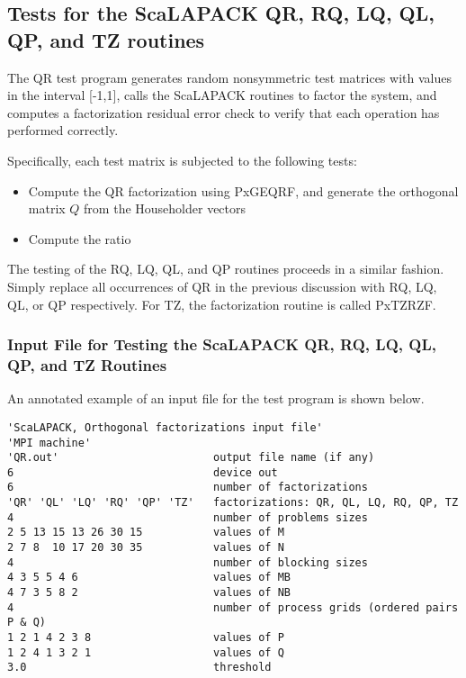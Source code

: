 \documentclass[11pt]{report}
\newcommand{\dent}{\hspace*{\parindent}}
\begin{document}
\subsection{Tests for the ScaLAPACK QR, RQ, LQ, QL, QP, and TZ routines}

The QR test program generates random nonsymmetric test matrices with
values in the interval [-1,1], calls the ScaLAPACK 
routines to factor the system, and computes a
factorization residual error check to verify that each operation has performed 
correctly.

Specifically, each test matrix is subjected to the following tests:

\begin{itemize}
\item
Compute the QR factorization using PxGEQRF, and generate the orthogonal
matrix $Q$ from the Householder vectors
\item
Compute the ratio
\end{itemize}

The testing of the RQ, LQ, QL, and QP routines proceeds in a similar
fashion.  Simply replace all occurrences of QR in the previous discussion
with RQ, LQ, QL, or QP respectively.  For TZ, the factorization routine
is called PxTZRZF.

\subsubsection{Input File for Testing the ScaLAPACK QR, RQ, LQ, QL, QP, and TZ Routines}
\dent
An annotated example of an input file for the
test program is shown below.

\begin{verbatim}
'ScaLAPACK, Orthogonal factorizations input file'
'MPI machine'
'QR.out'                        output file name (if any)
6                               device out
6                               number of factorizations
'QR' 'QL' 'LQ' 'RQ' 'QP' 'TZ'   factorizations: QR, QL, LQ, RQ, QP, TZ
4                               number of problems sizes
2 5 13 15 13 26 30 15           values of M
2 7 8  10 17 20 30 35           values of N
4                               number of blocking sizes
4 3 5 5 4 6                     values of MB
4 7 3 5 8 2                     values of NB
4                               number of process grids (ordered pairs P & Q)
1 2 1 4 2 3 8                   values of P
1 2 4 1 3 2 1                   values of Q
3.0                             threshold
\end{verbatim}
\end{document}
